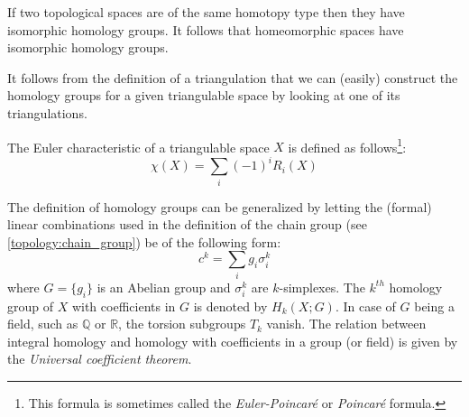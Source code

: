 	\begin{property}
		If two topological spaces are of the same homotopy type then they have isomorphic homology groups. It follows that homeomorphic spaces have isomorphic homology groups.
	\end{property}
	\begin{result}
		It follows from the definition of a triangulation that we can (easily) construct the homology groups for a given triangulable space by looking at one of its triangulations.
	\end{result}
	
	\begin{formula}
		The Euler characteristic of a triangulable space $X$ is defined as follows\footnote{This formula is sometimes called the \textit{Euler-Poincar\'e} or \textit{Poincar\'e} formula.}:
		\begin{equation}
			\boxed{\chi(X) = \sum_i(-1)^iR_i(X)}
		\end{equation}
	\end{formula}
	
	\begin{definition}
		The definition of homology groups can be generalized by letting the (formal) linear combinations used in the definition of the chain group (see \ref{topology:chain_group}) be of the following form:
		\begin{equation}
			c^k = \sum_ig_i\sigma_i^k
		\end{equation}
		where $G = \{g_i\}$ is an Abelian group and $\sigma_i^k$ are $k$-simplexes. The $k^{th}$ homology group of $X$ with coefficients in $G$ is denoted by $H_k(X; G)$. In case of $G$ being a field, such as $\mathbb{Q}$ or $\mathbb{R}$, the torsion subgroups $T_k$ vanish. The relation between integral homology and homology with coefficients in a group (or field) is given by the \textit{Universal coefficient theorem}.
	\end{definition}
	
